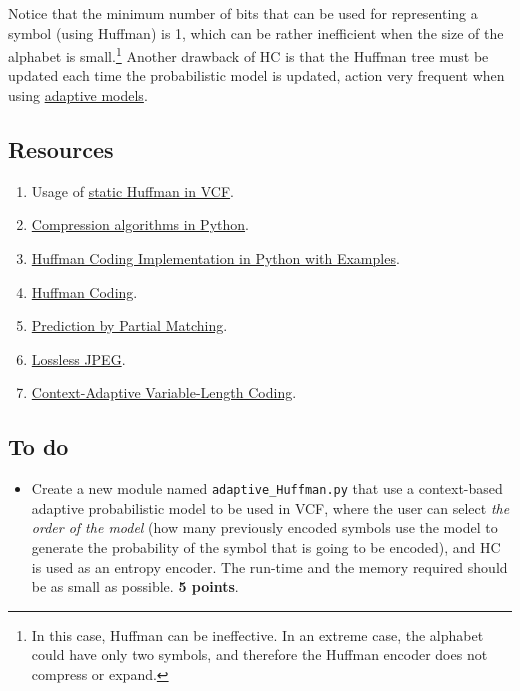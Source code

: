 Notice that the minimum number of bits that can be used for
representing a symbol (using Huffman) is 1, which can be rather
inefficient when the size of the alphabet is small.\footnote{In this
  case, Huffman can be ineffective. In an extreme case, the alphabet
  could have only two symbols, and therefore the Huffman encoder does
  not compress or expand.} Another drawback of HC is that the Huffman
tree must be updated each time the probabilistic model is updated,
action very frequent when using
\href{https://en.wikipedia.org/wiki/Adaptive_Huffman_coding}{adaptive
  models}.

\subsection*{Resources}
\begin{enumerate}
\item Usage of \href{https://github.com/Sistemas-Multimedia/VCF/blob/main/notebooks/Huffman.ipynb}{static Huffman in VCF}.
\item \href{https://www.inference.org.uk/mackay/python/compress/#Huff}{Compression algorithms in Python}.
\item \href{https://favtutor.com/blogs/huffman-coding}{Huffman Coding Implementation in Python with Examples}.
\item \href{https://www.programiz.com/dsa/huffman-coding}{Huffman Coding}.
\item \href{https://en.wikipedia.org/wiki/Prediction_by_partial_matching}{Prediction by Partial Matching}.
\item \href{https://en.wikipedia.org/wiki/Lossless_JPEG}{Lossless JPEG}.
\item \href{https://en.wikipedia.org/wiki/Context-adaptive_variable-length_coding}{Context-Adaptive Variable-Length Coding}.
\end{enumerate}

\subsection*{To do}
\begin{itemize}
\item Create a new module named \texttt{adaptive\_Huffman.py} that use
  a context-based adaptive probabilistic model
  \cite{nelson96datacompression} to be used in VCF, where the user can
  select \emph{the order of the model} (how many previously encoded
  symbols use the model to generate the probability of the symbol that
  is going to be encoded), and HC is used as an entropy encoder. The
  run-time and the memory required should be as small as
  possible. \textbf{5 points}.
\end{itemize}

